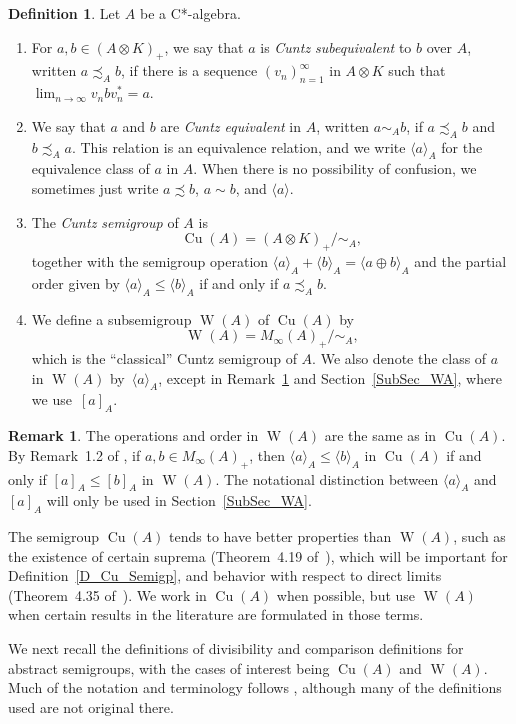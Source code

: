 \documentclass[10pt]{amsart}
\numberwithin{equation}{section}
\theoremstyle{definition}
\newtheorem{dfn}[thm]{Definition}
\newtheorem{rmk}[thm]{Remark}
\newcommand{\Cu}{{\operatorname{Cu}}}
\newcommand{\W}{{\operatorname{W}}}
\newcommand{\cc}[1]{\langle #1 \rangle}
\newcommand{\ccA}[1]{\langle #1 \rangle_A}
\newcommand{\cuntz}{\precsim}
\begin{document}
\begin{dfn}\label{D_Cuntz_Subeq}
Let $A$ be a C*-algebra.
%
\begin{enumerate}
%
\item
For $a,b \in (A \otimes K)_+$, we say that $a$ is
\emph{Cuntz subequivalent} to $b$ over $A$, written
$a \cuntz_A b$, if there is a sequence $(v_{n})_{n=1}^{\infty}$
in $A \otimes K$ such that $\lim_{n \to \infty} v_n b v_n^* = a$.
%
\item
We say that $a$ and $b$ are \emph{Cuntz equivalent} in $A$,
written $a \sim_{A} b$, if $a \cuntz_{A} b$ and $b \cuntz_{A} a$.
This relation is an equivalence relation, and we write $\cc{a}_A$
for the equivalence class of $a$ in $A$.
When there is no
possibility of confusion, we sometimes just write
$a \cuntz b$, $a \sim b$, and $\cc{a}$.
%
\item
The \emph{Cuntz semigroup} of $A$ is
%
\[
\Cu (A) = (A \otimes K)_{+} / \sim_{A},
\]
%
together with the semigroup operation $\cc{a}_A + \cc{b}_A =
\cc{a \oplus b}_A$ and the partial order given by
$\cc{a}_A \leq \cc{b}_A$ if and only if $a \cuntz_{A} b$.
%
\item
We define a subsemigroup $\W (A)$ of $\Cu (A)$ by
%
\[
\W (A) = M_{\infty}(A)_{+} / \sim_{A},
\]
%
which is the ``classical'' Cuntz semigroup of $A$.
We also denote the class of $a$ in $\W (A)$ by~$\ccA{a}$,
except in Remark~\ref{1903_rem}
and Section~\ref{SubSec_WA}, where we use~$[a]_A$.
%
\end{enumerate}
%
\end{dfn}

\begin{rmk}\label{1903_rem}
The operations and order in $\W (A)$ are the same as in $\Cu (A)$.
By Remark~1.2 of \cite{Phl40},
if $a,b \in M_{\infty}(A)_+$, then $\cc{a}_A \leq \cc{b}_A$ in $\Cu (A)$
if and only if $[a]_A \leq [b]_A$ in $\W (A)$.
The notational distinction between $\cc{a}_A$ and $[a]_A$ will only be
used in Section~\ref{SubSec_WA}.
\end{rmk}

The semigroup $\Cu (A)$ tends to have better properties than
$\W (A)$, such as the existence of certain suprema
(Theorem~4.19 of~\cite{APT}), which will be important for
Definition~\ref{D_Cu_Semigp}, and behavior with respect to
direct limits (Theorem~4.35 of~\cite{APT}).
We work in $\Cu (A)$
when possible, but use $\W (A)$ when certain results in the
literature are formulated in those terms.

We next recall the definitions of divisibility and comparison definitions for
abstract semigroups, with the cases of interest being
$\Cu (A)$ and $\W (A)$.
Much of the notation and terminology
follows \cite{AnPrTlVt}, although many of the definitions used
are not original there.
\end{document}
